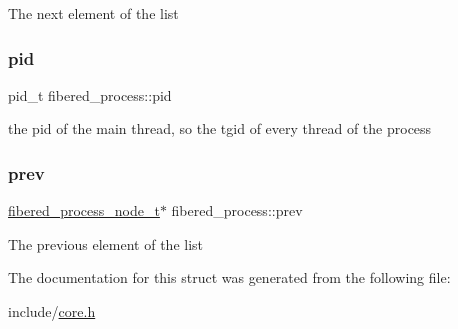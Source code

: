 The next element of the list \mbox{\label{structfibered__process_ad8f9adb6ee521988f3607ccf279e10a6}} 
\subsubsection{\texorpdfstring{pid}{pid}}
{\footnotesize\ttfamily pid\+\_\+t fibered\+\_\+process\+::pid}

the pid of the main thread, so the tgid of every thread of the process \mbox{\label{structfibered__process_adf5ba8614f416e75bc026fe449fdd08c}} 
\subsubsection{\texorpdfstring{prev}{prev}}
{\footnotesize\ttfamily \mbox{\hyperlink{core_8h_aa16708c717e33e5e95614cd1e4ca7b2b}{fibered\+\_\+process\+\_\+node\+\_\+t}}$\ast$ fibered\+\_\+process\+::prev}

The previous element of the list 

The documentation for this struct was generated from the following file\+:\begin{DoxyCompactItemize}
\item 
include/\mbox{\hyperlink{core_8h}{core.\+h}}\end{DoxyCompactItemize}
